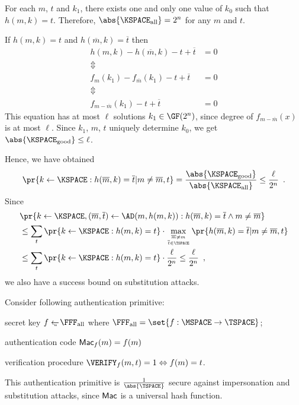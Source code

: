 \documentclass[landscape,footrule]{foils}
\begin{document}

For each $m$, $t$ and $k_1$, there exists one and only one value of
$k_0$ such that $h(m,k)=t$. Therefore,
$\abs{\KSPACE_{\mathrm{all}}}=2^{n}$ for any $m$ and $t$.

If $h(m,k)=t$ and $ h(\overline{m},k)=\overline{t}$ then 
\begin{align*}
  h(m,k)-h(\overline{m},k)-t+\overline{t}&=0\\
  \Updownarrow\qquad\qquad&\\
  f_m(k_1)-f_{\overline{m}}(k_1)-t+\overline{t}&=0\\
  \Updownarrow\qquad\qquad&\\
   f_{m-\overline{m}}(k_1)-t+\overline{t}&=0
\end{align*}
This equation has at most $\ell$ solutions $k_1\in\GF(2^n)$, since
degree of $f_{m-\overline{m}}(x)$ is at most $\ell$. Since $k_1$, $m$,
$t$ uniquely determine $k_0$, we get  $\abs{\KSPACE_{\mathrm{good}}}\leq \ell$.


Hence, we have obtained
\begin{align*}
  \pr{k\gets\KSPACE:h(\overline{m},k)=\overline{t}|m\neq\overline{m},t}
  =\frac{\abs{\KSPACE_{\mathrm{good}}}}{\abs{\KSPACE_{\mathrm{all}}}}\leq\frac{\ell}{2^n}\enspace.
\end{align*}
Since 
\begin{align*}
  & \pr{k\gets\KSPACE,
    (\overline{m},\overline{t})\gets
    \AD(m,h(m,k)):h(\overline{m},k)=\overline{t}\wedge m\neq\overline{m}}\\
  &\leq\sum_{t}\pr{k\gets\KSPACE:h(m,k)=t}\cdot \max_{\overline{m}\neq m\atop \overline{t}\in\TSPACE}
     \pr{h(\overline{m},k)=\overline{t}|m\neq\overline{m},t}\\
  &\leq \sum_{t}\pr{k\gets\KSPACE:h(m,k)=t}\cdot \frac{\ell}{2^n}\leq \frac{\ell}{2^n}\enspace,
\end{align*}
we also have a success bound on substitution attacks. 







Consider following authentication primitive:
\begin{triangles}
  \item secret key $f\getsu \FFFALL$ where $\FFFALL=\set{f:\MSPACE\to\TSPACE}$;
  \item authentication code $\mathsf{Mac}_f(m)=f(m)$
  \item verification procedure $\VERIFY_f(m,t)=1\Leftrightarrow f(m)=t$.
\end{triangles}
This authentication primitive is $\frac{1}{\abs{\TSPACE}}$ secure
against impersonation and substitution attacks, since $\mathsf{Mac}$ is a universal hash function. 
\end{document}
